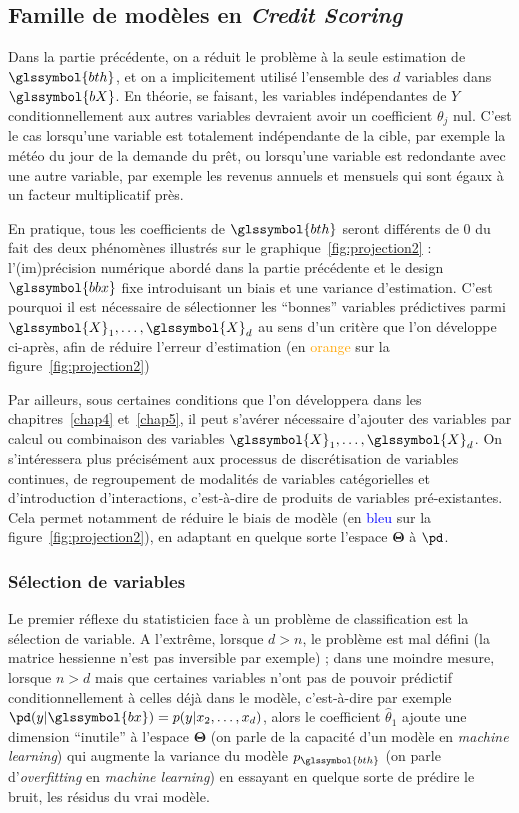 \subsection{Famille de modèles en \textit{Credit Scoring}}

Dans la partie précédente, on a réduit le problème à la seule estimation de $\glssymbol{bth}$, et on a implicitement utilisé l'ensemble des $d$ variables dans $\glssymbol{bX}$. En théorie, se faisant, les variables indépendantes de $Y$ conditionnellement aux autres variables devraient avoir un coefficient $\theta_j$ nul. C'est le cas lorsqu'une variable est totalement indépendante de la cible, par exemple la météo du jour de la demande du prêt, ou lorsqu'une variable est redondante avec une autre variable, par exemple les revenus annuels et mensuels qui sont égaux à un facteur multiplicatif près.

En pratique, tous les coefficients de $\glssymbol{bth}$ seront différents de $0$ du fait des deux phénomènes illustrés sur le graphique~\ref{fig:projection2} : l'(im)précision numérique abordé dans la partie précédente et le design $\glssymbol{bbx}$ fixe introduisant un biais et une variance d'estimation. C'est pourquoi il est nécessaire de sélectionner les ``bonnes'' variables prédictives parmi $\glssymbol{X}_1,\dots,\glssymbol{X}_d$ au sens d'un critère que l'on développe ci-après, afin de réduire l'erreur d'estimation (en \textcolor{orange}{orange} sur la figure~\ref{fig:projection2})

Par ailleurs, sous certaines conditions que l'on développera dans les chapitres~\ref{chap4} et~\ref{chap5}, il peut s'avérer nécessaire d'ajouter des variables par calcul ou combinaison des variables $\glssymbol{X}_1,\dots,\glssymbol{X}_d$. On s'intéressera plus précisément aux processus de discrétisation de variables continues, de regroupement de modalités de variables catégorielles et d'introduction d'interactions, c'est-à-dire de produits de variables pré-existantes. Cela permet notamment de réduire le biais de modèle (en \textcolor{blue}{bleu} sur la figure~\ref{fig:projection2}), en adaptant en quelque sorte l'espace $\bm{\Theta}$ à $\pd$.

\subsubsection{Sélection de variables} \label{subsubsec:selection}

Le premier réflexe du statisticien face à un problème de classification est la sélection de variable. A l'extrême, lorsque $d > n$, le problème est mal défini (la matrice hessienne n'est pas inversible par exemple) ; dans une moindre mesure, lorsque $n > d$ mais que certaines variables n'ont pas de pouvoir prédictif conditionnellement à celles déjà dans le modèle, c'est-à-dire par exemple $\pd(y | \glssymbol{bx}) = p(y|x_2,\dots,x_d)$, alors le coefficient $\hat{\theta}_1$ ajoute une dimension ``inutile'' à l'espace $\bm{\Theta}$ (on parle de la capacité d'un modèle en \textit{machine learning}) qui augmente la variance du modèle $p_{\glssymbol{bth}}$ (on parle d'\textit{overfitting} en \textit{machine learning}) en essayant en quelque sorte de prédire le bruit, les résidus du vrai modèle.

